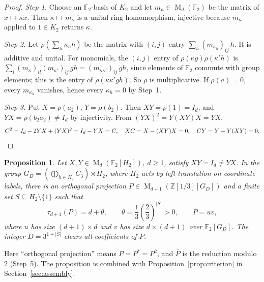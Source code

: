 \documentclass[11pt]{article}
\newtheorem{proposition}[theorem]{Proposition}
\theoremstyle{remark}
\numberwithin{equation}{section}
\newcommand{\F}{\mathbb F}
\newcommand{\Z}{\mathbb Z}
\newcommand{\Mat}{\operatorname{M}}
\begin{document}
\begin{proof}
\emph{Step 1.} Choose an $\F_2$-basis of $K_2$ and let $m_\kappa\in\Mat_d(\F_2)$ be the matrix of $x\mapsto\kappa x$. Then $\kappa\mapsto m_\kappa$ is a unital ring homomorphism, injective because $m_\kappa$ applied to $1\in K_2$ returns $\kappa$.

\emph{Step 2.} Let $\rho(\sum_h\kappa_hh)$ be the matrix with $(i,j)$ entry $\sum_h(m_{\kappa_h})_{ij}\,h$. It is additive and unital. For monomials, the $(i,j)$ entry of $\rho(\kappa g)\rho(\kappa'h)$ is $\sum_l(m_\kappa)_{il}(m_{\kappa'})_{lj}\,gh=(m_{\kappa\kappa'})_{ij}\,gh$, since elements of $\F_2$ commute with group elements; this is the entry of $\rho(\kappa\kappa'gh)$. So $\rho$ is multiplicative. If $\rho(a)=0$, every $m_{\kappa_h}$ vanishes, hence every $\kappa_h=0$ by Step~1.

\emph{Step 3.} Put $X=\rho(a_2)$, $Y=\rho(b_2)$. Then $XY=\rho(1)=I_d$, and $YX=\rho(b_2a_2)\ne I_d$ by injectivity. From $(YX)^2=Y(XY)X=YX$,
\[
 C^2=I_d-2YX+(YX)^2=I_d-YX=C,\quad XC=X-(XY)X=0,\quad CY=Y-Y(XY)=0.\qedhere
\]
\end{proof}

\begin{proposition}\label{prop:separation}
Let $X,Y\in\Mat_d(\F_2[H_2])$, $d\ge1$, satisfy $XY=I_d\ne YX$. In the group $G_D=(\bigoplus_{h\in H_2}C_3)\rtimes H_2$, where $H_2$ acts by left translation on coordinate labels, there is an orthogonal projection $P\in\Mat_{d+1}(\Z[1/3][G_D])$ and a finite set $S\subseteq H_2\setminus\{1\}$ such that
\[
 \tau_{d+1}(P)=d+\theta,\qquad
 \theta=\frac13\left(\frac23\right)^{|S|}>0,\qquad\bar P=uv,
\]
where $u$ has size $(d+1)\times d$ and $v$ has size $d\times(d+1)$ over $\F_2[G_D]$. The integer $D=3^{1+|S|}$ clears all coefficients of $P$.
\end{proposition}

Here ``orthogonal projection'' means $P=P^*=P^2$, and $\bar P$ is the reduction modulo $2$ (Step~5). The proposition is combined with Proposition~\ref{prop:criterion} in Section~\ref{sec:assembly}.
\end{document}
